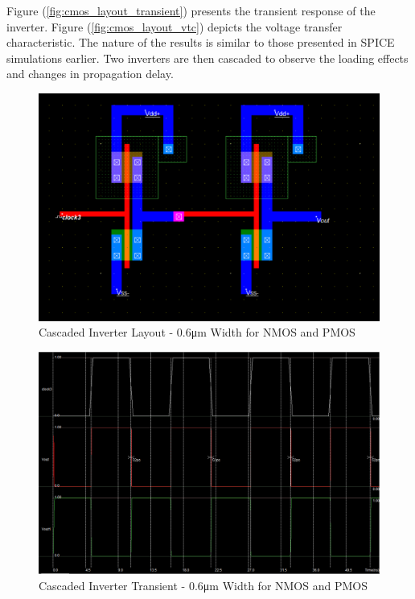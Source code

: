 \FloatBarrier

Figure (\ref{fig:cmos_layout_transient}) presents the transient response of the inverter.
Figure (\ref{fig:cmos_layout_vtc}) depicts the voltage transfer characteristic.
The nature of the results is similar to those presented in SPICE simulations earlier.
Two inverters are then cascaded to observe the loading effects and changes in propagation delay.

\FloatBarrier

\begin{figure}[h!]
	\centering
	\includegraphics[scale=0.75]{./images/cascaded_inverter_06nmos06pmos.PNG}
	\caption{Cascaded Inverter Layout - 0.6\si{\micro\meter} Width for NMOS and PMOS}
	\label{fig:cascaded_inverter_06nmos06pmos}
\end{figure}

\FloatBarrier

\FloatBarrier

\begin{figure}[h!]
	\centering
	\includegraphics[scale=0.50]{./images/cascaded_inverter_transient_06nmos06pmos.PNG}
	\caption{Cascaded Inverter Transient - 0.6\si{\micro\meter} Width for NMOS and PMOS}
	\label{fig:cascaded_inverter_transient_06nmos06pmos}
\end{figure}

